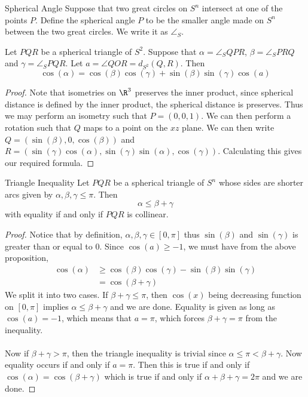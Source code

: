 \begin{defn}{Spherical Angle}{} Suppose that two great circles on $S^n$ intersect at one of the points $P$. Define the spherical angle $P$ to be the smaller angle made on $S^n$ between the two great circles. We write it as $\angle_S$. 
\end{defn}

\begin{prp}{}{} Let $PQR$ be a spherical triangle of $S^2$. Suppose that $\alpha=\angle_SQPR$, $\beta=\angle_SPRQ$ and $\gamma=\angle_S PQR$. Let $a=\angle QOR=d_{S^2}(Q,R)$. Then $$\cos(\alpha)=\cos(\beta)\cos(\gamma)+\sin(\beta)\sin(\gamma)\cos(a)$$\tcbline
\begin{proof}
Note that isometries on $\R^3$ preserves the inner product, since spherical distance is defined by the inner product, the spherical distance is preserves. Thus we may perform an isometry such that $P=(0,0,1)$. We can then perform a  rotation such that $Q$ maps to a point on the $xz$ plane. We can then write $Q=(\sin(\beta), 0, \cos(\beta))$ and $R=(\sin(\gamma)\cos(\alpha), \sin(\gamma)\sin(\alpha), \cos(\gamma))$. Calculating this gives our required formula. 
\end{proof}
\end{prp}

\begin{prp}{Triangle Inequality}{} Let $PQR$ be a spherical triangle of $S^n$ whose sides are shorter arcs given by $\alpha,\beta,\gamma\leq\pi$. Then $$\alpha\leq\beta+\gamma$$ with equality if and only if $PQR$ is collinear. \tcbline
\begin{proof}
Notice that by definition, $\alpha,\beta,\gamma\in[0,\pi]$ thus $\sin(\beta)$ and $\sin(\gamma)$ is greater than or equal to $0$. Since $\cos(a)\geq-1$, we must have from the above proposition, 
\begin{align*}
\cos(\alpha)&\geq\cos(\beta)\cos(\gamma)-\sin(\beta)\sin(\gamma)\\
&=\cos(\beta+\gamma)
\end{align*}
We split it into two cases. If $\beta+\gamma\leq\pi$, then $\cos(x)$ being decreasing function on $[0,\pi]$ implies $\alpha\leq\beta+\gamma$ and we are done. Equality is given as long as $\cos(a)=-1$, which means that $a=\pi$, which forces $\beta+\gamma=\pi$ from the inequality. \\~\\
Now if $\beta+\gamma>\pi$, then the triangle inequality is trivial since $\alpha\leq\pi<\beta+\gamma$. Now equality occurs if and only if $a=\pi$. Then this is true if and only if $\cos(\alpha)=\cos(\beta+\gamma)$ which is true if and only if $\alpha+\beta+\gamma=2\pi$ and we are done. 
\end{proof}
\end{prp}

